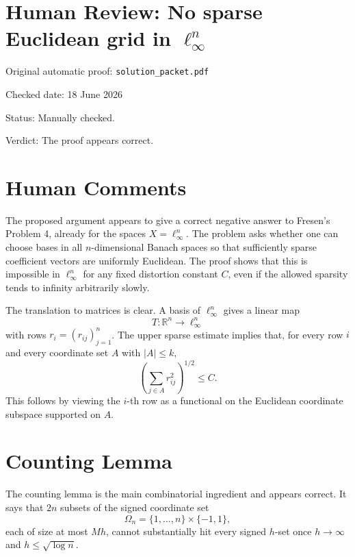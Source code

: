 \documentclass[11pt]{article}
\begin{document}
\section*{Human Review: No sparse Euclidean grid in \texorpdfstring{$\ell_\infty^n$}{ell-infinity-n}}

\noindent Original automatic proof: \texttt{solution\_packet.pdf}

\noindent Checked date: 18 June 2026

\noindent Status: Manually checked.

\noindent Verdict: The proof appears correct.

\section*{Human Comments}

The proposed argument appears to give a correct negative answer to Fresen's
Problem 4, already for the spaces \(X=\ell_\infty^n\).  The problem asks
whether one can choose bases in all \(n\)-dimensional Banach spaces so that
sufficiently sparse coefficient vectors are uniformly Euclidean.  The proof
shows that this is impossible in \(\ell_\infty^n\) for any fixed distortion
constant \(C\), even if the allowed sparsity tends to infinity arbitrarily
slowly.

The translation to matrices is clear.  A basis of \(\ell_\infty^n\) gives a
linear map
\[
  T:\mathbb R^n\longrightarrow \ell_\infty^n
\]
with rows \(r_i=(r_{ij})_{j=1}^n\).  The upper sparse estimate implies that,
for every row \(i\) and every coordinate set \(A\) with \(|A|\leq k\),
\[
  \left(\sum_{j\in A} r_{ij}^2\right)^{1/2}\leq C.
\]
This follows by viewing the \(i\)-th row as a functional on the Euclidean
coordinate subspace supported on \(A\).

\section*{Counting Lemma}

The counting lemma is the main combinatorial ingredient and appears correct.
It says that \(2n\) subsets of the signed coordinate set
\[
  \Omega_n=\{1,\ldots,n\}\times\{-1,1\},
\]
each of size at most \(Mh\), cannot substantially hit every signed \(h\)-set
once \(h\to\infty\) and \(h\leq \sqrt{\log n}\).
\end{document}
